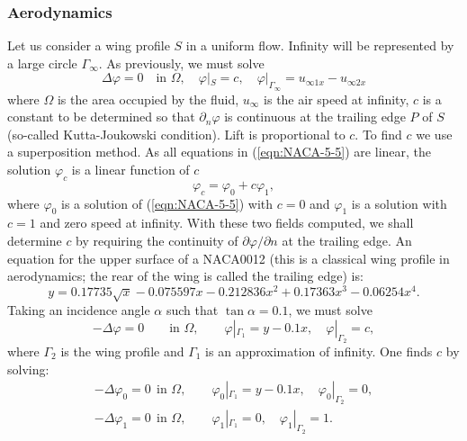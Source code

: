 \documentclass[a4paper,twoside,12pt]{book}
\def\p{\partial}
\begin{document}
\subsubsection{Aerodynamics}
Let us consider a wing profile $S$ in a uniform flow.
Infinity will be represented
by a large circle $\Gamma_{\infty}$.
As previously, we must solve
\begin{equation}
\label{eqn:NACA-5-5}
\Delta \varphi=0\quad\textrm{in }\Omega,
\quad \varphi|_S=c,\quad
\varphi|_{\Gamma_{\infty}}=u_{\infty 1x}-u_{\infty2x}
\end{equation}
where $\Omega$ is the area occupied by the
fluid, $u_{\infty}$ is the air speed at infinity, $c$
is a constant to be determined so that
$\p_n\varphi$ is continuous at the trailing edge
$P$ of $S$ (so-called Kutta-Joukowski condition).
Lift is proportional to $c$.
To find $c$ we use a superposition method. As all equations in
(\ref{eqn:NACA-5-5}) are
linear, the solution $\varphi_c$ is a linear function of $c$
\begin{equation}
\label{eqn:NACA-5-6}
\varphi_c = \varphi_0 + c\varphi_1,
\end{equation}
where $\varphi_0$ is a solution of (\ref{eqn:NACA-5-5}) with $c = 0$ and
$\varphi_1$ is a solution with $c = 1$ and
zero speed at infinity.
With these two fields computed, we shall determine $c$
by requiring the continuity of $\p \varphi /\p n$ at the trailing edge.
An equation for the upper surface of a NACA0012 (this is a classical wing
profile in aerodynamics; the rear of the wing is called the trailing edge) is:
\begin{equation}
\label{eqn:NACA-5-7} y = 0.17735\sqrt{x} - 0.075597x - 0.212836x^2 +
0.17363x^3 - 0.06254x^4.
\end{equation}
Taking an incidence angle $\alpha$ such that $\tan \alpha = 0.1$, we must solve
\begin{equation}
\label{eqn:NACA-5-8}
-\Delta\varphi  = 0\qquad \textrm{in }\Omega, \qquad
\varphi|_{\Gamma_1} = y - 0.1x,\quad \varphi |_{\Gamma_2} = c,
\end{equation}
where $\Gamma_2$ is the wing profile and $\Gamma_1$ is an approximation of
infinity. One finds $c$ by solving:
\begin{eqnarray}
\label{eqn:NACA-5-9}
-\Delta\varphi_0 = 0 ~~\textrm{in }\Omega,\qquad
\varphi_0|_{\Gamma_1} = y - 0.1x, \quad \varphi_0|_{\Gamma_2} = 0,\\
\label{eqn:NACA-5-10}
-\Delta\varphi_1 = 0 ~~\textrm{in }\Omega, \qquad
\varphi_1|_{\Gamma_1} = 0, \quad \varphi_1|_{\Gamma_2} = 1.
\end{eqnarray}
\end{document}
